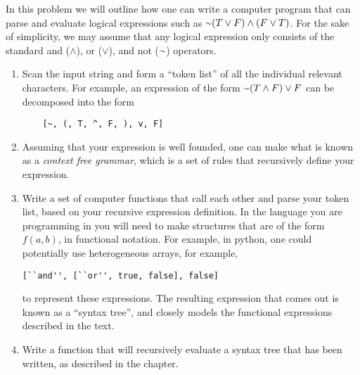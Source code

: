 In this problem we will outline how one can write a computer program that can parse and evaluate logical expressions such as $\shortsim(T \lor F) \land (F \lor T)$. For the sake of simplicity, we may assume that any logical expression only consists of the standard and ($\land$), or ($\lor$), and not ($\shortsim$) operators.

\begin{enumerate}
	\item Scan the input string and form a ``token list'' of all the individual relevant characters. For example, an expression of the form $\shortsim(T \land F) \lor F$ can be decomposed into the form  
\begin{verbatim}
	[~, (, T, ^, F, ), v, F]
\end{verbatim}
	\item Assuming that your expression is well founded, one can make what is known as a \textit{context free grammar}, which is a set of rules that recursively define your expression.
	\item Write a set of computer functions that call each other and parse your token list, based on your recursive expression definition. In the language you are programming in you will need to make structures that are of the form $f(a, b)$, in functional notation. For example, in python, one could potentially use heterogeneous arrays, for example,
\begin{verbatim}
[``and'', [``or'', true, false], false]
\end{verbatim}
to represent these expressions. The resulting expression that comes out is known as a ``syntax tree'', and closely models the functional expressions described in the text.
	\item Write a function that will recursively evaluate a syntax tree that has been written, as described in the chapter.
\end{enumerate}